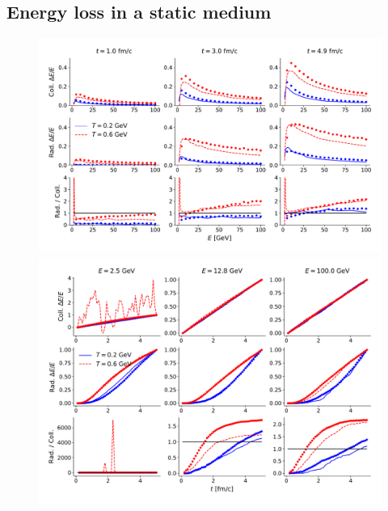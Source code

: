 \documentclass[aps, prc, reprint, amsmath, groupedaddress, nofootinbib]{revtex4-1}
\begin{document}
\subsection{Energy loss in a static medium}
\begin{figure}
\includegraphics[width=.8\textwidth]{E_Eloss.pdf}\\
\includegraphics[width=.8\textwidth]{L_Eloss.pdf}
\end{figure}
\end{document}
